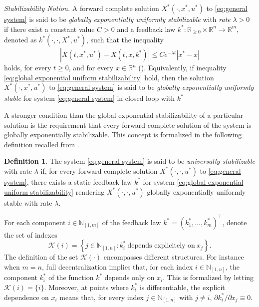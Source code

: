 \documentclass[10pt,twocolumn,twoside]{IEEEtran}
\theoremstyle{plain}
\theoremstyle{definition}
\newtheorem{definition}[theorem]{Definition}
\theoremstyle{remark}
\begin{document}
{\itshape Stabilizability Notion.} A forward complete solution $X^\ast(\cdot,x^\ast,u^\ast)$ to \eqref{eq:general system} is said to be  \emph{globally exponentially uniformly stabilizable} with \emph{rate} $\lambda>0$ if there exist a constant value $C>0$ and a feedback law $k^\ast:\mathbb{R}_{\geq0}\times\mathbb{R}^n\to\mathbb{R}^m$, denoted as $k^\ast(\cdot,\cdot,X^\ast,u^\ast)$, such that the inequality
\begin{equation}\label{eq:global exponential uniform stabilizability}
	\left|X(t,x^\ast,u^\ast)-X(t,x,k^\ast)\right|\leq Ce^{-\lambda t}|x^\ast-x|
\end{equation}
holds, for every $t\geq0$, and for every $x\in\mathbb{R}^n$ (\cite{Manchester2014a}). Equivalently, if inequality \eqref{eq:global exponential uniform stabilizability} hold, then the solution $X^\ast(\cdot,x^\ast,u^\ast)$ to \eqref{eq:general system} is said to be \emph{globally exponentially uniformly stable} for system \eqref{eq:general system} in closed loop with $k^\ast$

A stronger condition than the global exponential stabilizability of a particular solution is the requirement that every forward complete solution of the system is globally exponentially stabilizable. This concept is formalized in the following definition recalled from \cite{Manchester2014a}.

\begin{definition}\label{def:US}
	The system \eqref{eq:general system} is said to be \emph{universally stabilizable} with rate $\lambda$ if, for every forward complete solution $X^\ast(\cdot,\cdot,u^\ast)$ to \eqref{eq:general system}, there exists a static feedback law $k^\ast$ for system \eqref{eq:global exponential uniform stabilizability} rendering $X^\ast(\cdot,\cdot,u^\ast)$ globally exponentially uniformly stable with rate $\lambda$.
\end{definition}

For each component $i\in\mathbb{N}_{[1,m]}$ of the feedback law $k^\ast=(k_1^\ast,\ldots,k_m^\ast)^\top$, denote the set of indexes
\begin{equation*}
	\mathscr{K}(i)=\left\{j\in\mathbb{N}_{[1,n]}:k_i^\ast\ \text{depends explicitely on}\ x_j \right\}.
\end{equation*}
The definition of the set $\mathscr{K}(\cdot)$ encompasses different structures. For instance when $m=n$, full decentralization implies that, for each index $i\in\mathbb{N}_{[1,n]}$, the component $k_i^\ast$ of the function $k^\ast$ depends only on $x_i$. This is formalized by letting $\mathscr{K}(i)=\{i\}$. Moreover, at points where $k_i^\ast$ is differentiable, the explicit dependence on $x_i$ means that, for every index $j\in\mathbb{N}_{[1,n]}$ with $j\neq i$, $\partial k_i^\ast/\partial x_j\equiv0$.
\end{document}
